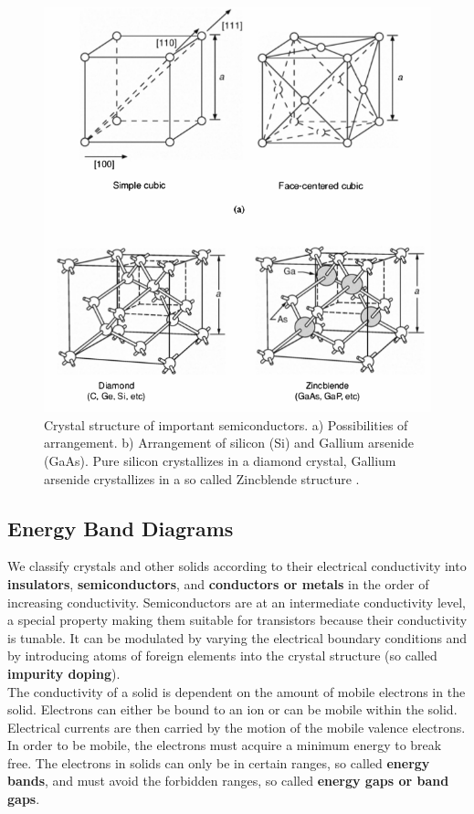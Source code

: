 \documentclass[main]{subfiles}
\begin{document}
\begin{figure}[H]
\centering
\includegraphics[scale=0.3]{figs/crystal_structure.png}
\caption{Crystal structure of important semiconductors. a) Possibilities of arrangement. b) Arrangement of silicon (Si) and Gallium arsenide (GaAs). Pure silicon crystallizes in a diamond crystal, Gallium arsenide crystallizes in a so called Zincblende structure \cite{book:VLSI}.}
\end{figure}

\subsection{Energy Band Diagrams}
We classify crystals and other solids according to their electrical conductivity into \textbf{insulators}, \textbf{semiconductors}, and \textbf{conductors or metals} in the order of increasing conductivity. Semiconductors are at an intermediate conductivity level, a special property making them suitable for transistors because their conductivity is tunable. It can be modulated by varying the electrical boundary conditions and by introducing atoms of foreign elements into the crystal structure (so called \textbf{impurity doping}).\\
The conductivity of a solid is dependent on the amount of mobile electrons in the solid. Electrons can either be bound to an ion or can be mobile within the solid. Electrical currents are then carried by the motion of the mobile valence electrons. In order to be mobile, the electrons must acquire a minimum energy to break free. The electrons in solids can only be in certain ranges, so called \textbf{energy bands}, and must avoid the forbidden ranges, so called \textbf{energy gaps or band gaps}.
\end{document}
